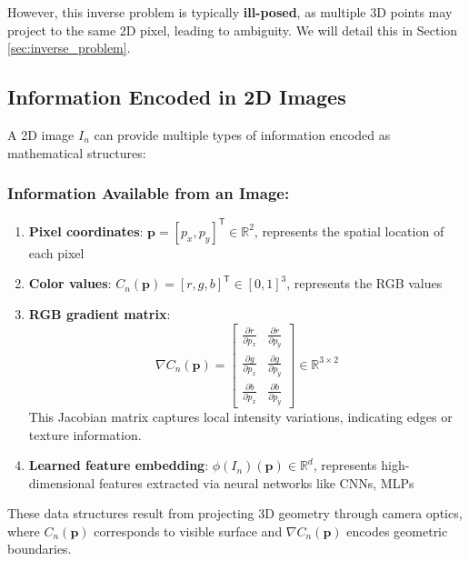 \documentclass[12pt]{article}
\newcommand{\R}{\mathbb{R}}
\newcommand{\vect}[1]{\bm{#1}}
\theoremstyle{definition}
\begin{document}
However, this inverse problem is typically \textbf{ill-posed}, as multiple 3D points may project to the same 2D pixel, leading to ambiguity. We will detail this in Section \ref{sec:inverse_problem}.

\subsection{Information Encoded in 2D Images} \label{sec:image_info}

A 2D image $I_n$ can provide multiple types of information encoded as mathematical structures:

\subsubsection*{Information Available from an Image:}
\begin{enumerate}[label=(\roman*)]
    \item \textbf{Pixel coordinates}: $\vect{p} = [p_x, p_y]^\mathsf{T} \in \R^2$, represents the spatial location of each pixel
    
    \item \textbf{Color values}: $C_n(\vect{p}) = [r, g, b]^\mathsf{T} \in [0,1]^3$, represents the RGB values
    
    \item \textbf{RGB gradient matrix}:
    \begin{equation}
        \nabla C_n(\vect{p}) = \begin{bmatrix}
            \frac{\partial r}{\partial p_x} & \frac{\partial r}{\partial p_y} \\[0.5em]
            \frac{\partial g}{\partial p_x} & \frac{\partial g}{\partial p_y} \\[0.5em]
            \frac{\partial b}{\partial p_x} & \frac{\partial b}{\partial p_y}
        \end{bmatrix} \in \R^{3 \times 2} \label{eq:gradient}
    \end{equation}
    This Jacobian matrix captures local intensity variations, indicating edges or texture information.
    
    \item \textbf{Learned feature embedding}: $\phi(I_n)(\vect{p}) \in \R^d$, represents high-dimensional features extracted via neural networks like CNNs, MLPs
\end{enumerate}

These data structures result from projecting 3D geometry through camera optics, where $C_n(\vect{p})$ corresponds to visible surface and $\nabla C_n(\vect{p})$ encodes geometric boundaries.
\end{document}
